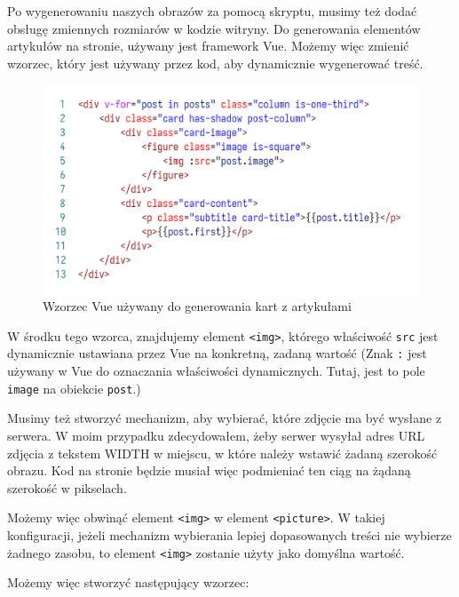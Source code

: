 \documentclass[licencjacka]{pracadypl}
\begin{document}
Po wygenerowaniu naszych obrazów za pomocą skryptu, musimy też dodać obsługę zmiennych rozmiarów w kodzie witryny. Do generowania elementów artykułów na stronie, używany jest framework Vue. Możemy więc zmienić wzorzec, który jest używany przez kod, aby dynamicznie wygenerować treść.

\begin{figure}[H]
  \includegraphics[width=\linewidth]{images/code-vue-image-card-old.png}
  \caption{Wzorzec Vue używany do generowania kart z artykułami}
  \label{fig:code-vue-template-articles-old}
\end{figure}

W środku tego wzorca, znajdujemy element \texttt{<img>}, którego właściwość \texttt{src} jest dynamicznie ustawiana przez Vue na konkretną, zadaną wartość (Znak \texttt{:} jest używany w Vue do oznaczania właściwości dynamicznych. Tutaj, jest to pole \texttt{image} na obiekcie \texttt{post}.)

Musimy też stworzyć mechanizm, aby wybierać, które zdjęcie ma być wysłane z serwera. W moim przypadku zdecydowałem, żeby serwer wysyłał adres URL zdjęcia z tekstem WIDTH w miejscu, w które należy wstawić żadaną szerokość obrazu. Kod na stronie będzie musiał więc podmieniać ten ciąg na żądaną szerokość w pikselach.

Możemy więc obwinąć element \texttt{<img>} w element \texttt{<picture>}. W takiej konfiguracji, jeżeli mechanizm wybierania lepiej dopasowanych treści nie wybierze żadnego zasobu, to element \texttt{<img>} zostanie użyty jako domyślna wartość.

Możemy więc stworzyć następujący wzorzec:
\end{document}
